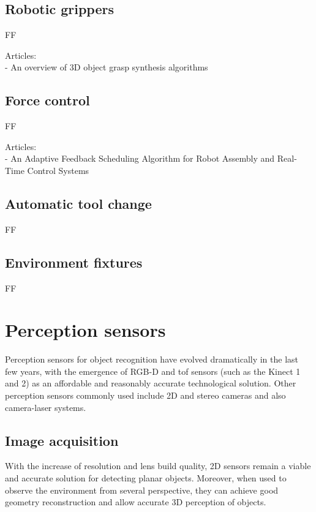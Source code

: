 \subsection{Robotic grippers}

FF

Articles:\\
- An overview of 3D object grasp synthesis algorithms



\subsection{Force control}

FF

Articles:\\
- An Adaptive Feedback Scheduling Algorithm for Robot Assembly and Real-Time Control Systems


\subsection{Automatic tool change}

FF


\subsection{Environment fixtures}

FF


\section{Perception sensors}

Perception sensors for object recognition have evolved dramatically in the last few years, with the emergence of RGB-D and \gls{tof} sensors (such as the Kinect 1 and 2) as an affordable and reasonably accurate technological solution. Other perception sensors commonly used include 2D and stereo cameras and also camera-laser systems.


\subsection{Image acquisition}\label{sec:image-acquisition}

With the increase of resolution and lens build quality, 2D sensors remain a viable and accurate solution for detecting planar objects. Moreover, when used to observe the environment from several perspective, they can achieve good geometry reconstruction and allow accurate 3D perception of objects.


